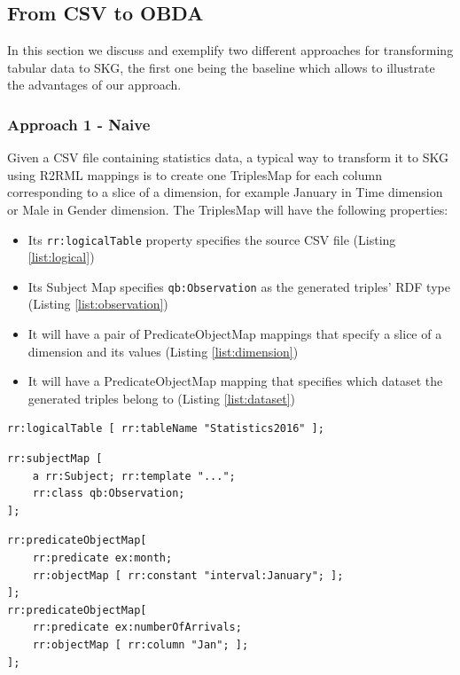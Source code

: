 \subsection{From CSV to OBDA}
In this section we discuss and exemplify two different approaches for transforming tabular data to SKG, the first one being the baseline which allows to illustrate the advantages of our approach.

\subsubsection{Approach 1 - Naive}
Given a CSV file containing statistics data, a typical way to transform it to SKG using R2RML mappings is to create one TriplesMap for each column corresponding to a slice of a dimension, for example January in Time dimension or Male in Gender dimension. The TriplesMap will have the following properties:
\begin{itemize}
\item Its \texttt{rr:logicalTable} property specifies the source CSV file (Listing \ref{list:logical})
\item Its Subject Map specifies \texttt{qb:Observation} as the generated triples’ RDF type (Listing \ref{list:observation})
\item It will have a pair of PredicateObjectMap mappings that specify a slice of a dimension and its values (Listing \ref{list:dimension})
\item It will have a PredicateObjectMap mapping that specifies which dataset the generated triples belong to (Listing \ref{list:dataset})
\end{itemize}

\begin{lstlisting}[float,caption=Data source mapping,frame=tlrb,label={list:logical}, columns=fullflexible]
rr:logicalTable [ rr:tableName "Statistics2016" ];
\end{lstlisting}

\begin{lstlisting}[float,caption=Observation mapping,frame=tlrb,label={list:observation}, columns=fullflexible]
rr:subjectMap [ 
    a rr:Subject; rr:template "..."; 
    rr:class qb:Observation; 
];
\end{lstlisting}

\begin{lstlisting}[float,caption=Dimension slice mapping,frame=tlrb,label={list:dimension}, columns=fullflexible]
rr:predicateObjectMap[ 
    rr:predicate ex:month; 
    rr:objectMap [ rr:constant "interval:January"; ];  
];
rr:predicateObjectMap[ 
    rr:predicate ex:numberOfArrivals; 
    rr:objectMap [ rr:column "Jan"; ]; 
];
\end{lstlisting}

